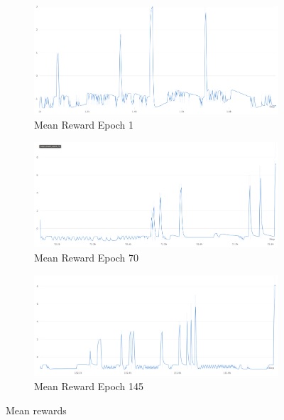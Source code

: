 \documentclass{scrartcl}
\begin{document}
\begin{figure}
  \centering
  \begin{subfigure}[b]{0.45\textwidth}
      \centering
      \includegraphics[width=\textwidth]{img/mean_reward_1_epoch.png}
      \caption{Mean Reward Epoch 1}
      \label{fig:d}
  \end{subfigure}
  \hfill
  \begin{subfigure}[b]{0.45\textwidth}
      \centering
      \includegraphics[width=\textwidth]{img/mean_reward_70_epoch.png}
      \caption{Mean Reward Epoch 70}
      \label{fig:e}
  \end{subfigure}
  \hfill
  \begin{subfigure}[b]{0.45\textwidth}
      \centering
      \includegraphics[width=\textwidth]{img/mean_reward_145_epoch.png}
      \caption{Mean Reward Epoch 145} 
      \label{fig:f}
  \end{subfigure}
  \caption{Mean rewards}
\end{figure}
\end{document}
